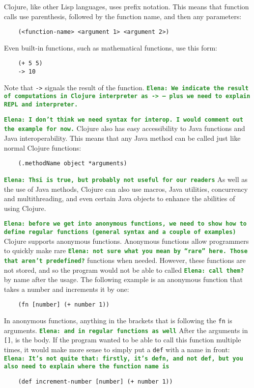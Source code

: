 \documentclass[12pt]{article}
\newcommand{\comment}[1]{{\bf \tt  {#1}}}
\newcommand{\emcomment}[1]{\textcolor{ForestGreen}{\comment{Elena: {#1}}}}
\begin{document}
Clojure, like other Lisp languages, uses prefix notation. This means
that function calls use parenthesis, followed by the function name,
and then any parameters: 
\begin{verbatim}
	(<function-name> <argument 1> <argument 2>)
\end{verbatim}

Even built-in functions, such as mathematical functions, use this form:
\begin{verbatim}
	(+ 5 5)
	-> 10
\end{verbatim}

Note that \texttt{->} signals the result of the
function. \emcomment{We indicate the result of computations in Clojure
  interpreter as \texttt{->} -- plus we need to explain REPL and
  interpreter.}

\emcomment{I don't think we need syntax for interop. I would comment
 out the example for now.}
Clojure also has easy accessibility to Java functions and Java
interoperability. This means that any Java method can be called just
like normal Clojure functions: 
\begin{verbatim}
	(.methodName object *arguments)
\end{verbatim}

\emcomment{Thsi is true, but probably not useful for our readers}
As well as the use of Java methods, Clojure can also use macros, Java
utilities, concurrency and multithreading, and even certain Java
objects to enhance the abilities of using Clojure. 

\emcomment{before we get into anonymous functions, we need to show how
to define regular functions (general syntax and a couple of examples)}
Clojure supports anonymous functions. Anonymous functions allow
programmers to quickly make rare \emcomment{not sure what you mean by
  ``rare'' here. Those that aren't predefined?}  functions when
needed. 
However, these
functions are not  stored, and so the program would not be able to
called \emcomment{call them?} by name after the usage. 
The following example is an anonymous
function that takes a number and increments it by one: 
\begin{verbatim}
	(fn [number] (+ number 1))
\end{verbatim}

In anonymous functions, anything in the brackets that is following the
\texttt{fn} is arguments. 
\emcomment{and in regular functions as well} 
After the arguments in \texttt{[]}, is the
body. If the program wanted to be able to call this function multiple
times, it would make more sense to simply put a \texttt{def} with a
name in front: 
\emcomment{It's not quite that: firstly, it's defn, and not def, but
  you also need to explain where the function name is}
\begin{verbatim}
	(def increment-number [number] (+ number 1))
\end{verbatim}
\end{document}

